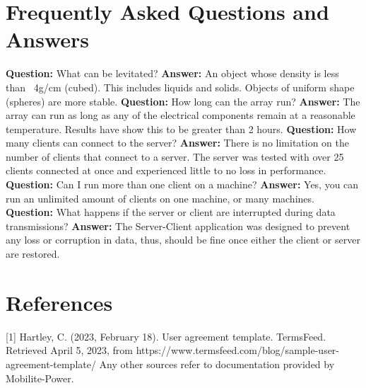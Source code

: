 \documentclass[12pt, titlepage]{article}
\begin{document}
\section{Frequently Asked Questions and Answers}
\textbf{Question:} What can be levitated?
\newline
\textbf{Answer:} An object whose density is less than ~4g/cm (cubed). This includes liquids and solids. Objects of uniform shape (spheres) are more stable.
\newline
\newline
\textbf{Question:} How long can the array run?
\newline
\textbf{Answer:} The array can run as long as any of the electrical components remain at a reasonable temperature. Results have show this to be greater than 2 hours.
\newline
\newline
\textbf{Question:} How many clients can connect to the server?
\newline
\textbf{Answer:} There is no limitation on the number of clients that connect to a server. The server was tested with over 25 clients connected at once and experienced little to no loss in performance.
\newline
\newline
\textbf{Question:} Can I run more than one client on a machine?
\newline
\textbf{Answer:} Yes, you can run an unlimited amount of clients on one machine, or many machines.
\newline
\newline
\textbf{Question:} What happens if the server or client are interrupted during data transmissions?
\newline
\textbf{Answer:} The Server-Client application was designed to prevent any loss or corruption in data, thus, should be fine once either the client or server are restored.

\section*{References}
[1] Hartley, C. (2023, February 18). User agreement template. TermsFeed. Retrieved April 5, 2023, from https://www.termsfeed.com/blog/sample-user-agreement-template/ 
\newline
Any other sources refer to documentation provided by Mobilite-Power.
\end{document}
